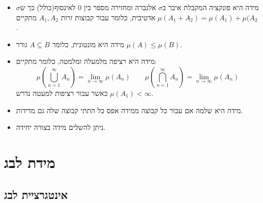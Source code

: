 \documentclass{tstextbook}
\begin{document}
\begin{summary}
  \begin{itemize}
    \item מידה היא פונקציה המקבלת איבר ב\(\sigma\) אלגברה ומחזירה מספר בין 0 לאינסוף(כולל) כך ש\(\sigma\) אדטיבית, כלומר עבור קבוצות זרות \(A_{1},A_{2}\) מתקיים \(\mu(A_{1}+A_{2})=\mu(A_{1})+\mu(A_{2}\).
    \item מידה היא מונטונית, כלומר \(A\subseteq B\) גורר \(\mu(A)\leq \mu(B)\).
    \item מידה היא רציפה מלמעלה ומלמטה, כלומר מתקיים:
$$\mu\left( \bigcup_{n=1}^{\infty}A_{n} \right)=\lim_{ n \to \infty } \mu(A_{n})\qquad \mu\left( \bigcap_{n=1}^{\infty}A_{n} \right)=\lim_{ n \to \infty } \mu(A_{n})$$
כאשר עבור רציפות למעטה נדרש \(\mu(A_{1})< \infty\).
    \item מידה היא שלמה אם עבור כל קבוצה ממידה אפס כל התתי קבוצה שלה גם מדידות.
    \item ניתן להשלים מידה בצורה יחידה.
  \end{itemize}
\end{summary}
\section{מידת לבג}

\subsection{אינטגרציית לבג}
\end{document}
